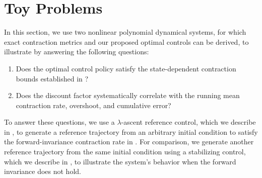 \documentclass[lettersize,journal]{IEEEtran}
\begin{document}






\section{Toy Problems}\label{sec:toy}
In this section, we use two nonlinear polynomial dynamical systems, 
for which exact contraction metrics and our proposed optimal controls can be derived, 
to illustrate  by answering the following questions:
\begin{enumerate}
    \item Does the optimal control policy satisfy the state-dependent contraction bounds established in ?
    \item Does the discount factor systematically correlate with the running mean contraction rate, overshoot, and cumulative error?
\end{enumerate}

To answer these questions, we use a $\lambda$-ascent reference control, which we describe in , to generate a reference trajectory
from an arbitrary initial condition to satisfy the forward-invariance contraction rate in .
For comparison, we generate another reference trajectory from the same initial condition 
using a stabilizing control, which we describe in , to illustrate the system's behavior when the forward invariance does not hold.
\end{document}
